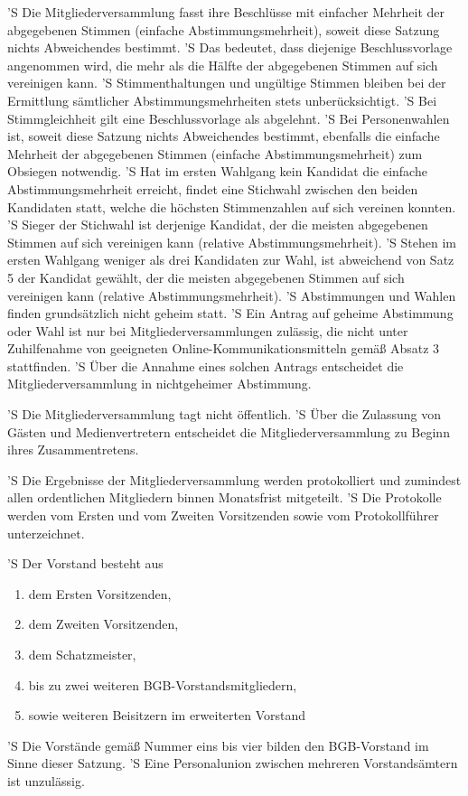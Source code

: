 \documentclass[a4paper,10pt]{scrreprt}
\begin{document}
\begin{contract}
'S Die Mitgliederversammlung fasst ihre Beschlüsse mit einfacher Mehrheit der
abgegebenen Stimmen (einfache Abstimmungsmehrheit), soweit diese Satzung nichts
Abweichendes bestimmt.
'S Das bedeutet, dass diejenige Beschlussvorlage angenommen wird, die mehr als
die Hälfte der abgegebenen Stimmen auf sich vereinigen kann.
'S Stimmenthaltungen und ungültige Stimmen bleiben bei der Ermittlung
sämtlicher Abstimmungsmehrheiten stets unberücksichtigt.
'S Bei Stimmgleichheit gilt eine Beschlussvorlage als abgelehnt.
'S Bei Personenwahlen ist, soweit diese Satzung nichts Abweichendes bestimmt,
ebenfalls die einfache Mehrheit der abgegebenen Stimmen (einfache
Abstimmungsmehrheit) zum Obsiegen notwendig.
'S Hat im ersten Wahlgang kein Kandidat die einfache Abstimmungsmehrheit
erreicht, findet eine Stichwahl zwischen den beiden Kandidaten statt, welche
die höchsten Stimmenzahlen auf sich vereinen konnten.
'S Sieger der Stichwahl ist derjenige Kandidat, der die meisten abgegebenen
Stimmen auf sich vereinigen kann (relative Abstimmungsmehrheit).
'S Stehen im ersten Wahlgang weniger als drei Kandidaten zur Wahl, ist
abweichend von Satz 5 der Kandidat gewählt, der die meisten abgegebenen Stimmen
auf sich vereinigen kann (relative Abstimmungsmehrheit).
'S Abstimmungen und Wahlen finden grundsätzlich nicht geheim statt.
'S Ein Antrag auf geheime Abstimmung oder Wahl ist nur bei
Mitgliederversammlungen zulässig, die nicht unter Zuhilfenahme von geeigneten
Online-Kommunikationsmitteln gemäß Absatz 3 stattfinden.
'S Über die Annahme eines solchen Antrags entscheidet die Mitgliederversammlung
in nichtgeheimer Abstimmung.

'S Die Mitgliederversammlung tagt nicht öffentlich.
'S Über die Zulassung von Gästen und Medienvertretern entscheidet die
Mitgliederversammlung zu Beginn ihres Zusammentretens.

'S Die Ergebnisse der Mitgliederversammlung werden protokolliert und zumindest
allen ordentlichen Mitgliedern binnen Monatsfrist mitgeteilt.
'S Die Protokolle werden vom Ersten und vom Zweiten Vorsitzenden sowie vom
Protokollführer unterzeichnet.


'S Der Vorstand besteht aus
\begin{enumerate}
	\item dem Ersten Vorsitzenden,
	\item dem Zweiten Vorsitzenden,
	\item dem Schatzmeister,
	\item bis zu zwei weiteren BGB-Vorstandsmitgliedern,
	\item sowie weiteren Beisitzern im erweiterten Vorstand
\end{enumerate}
'S Die Vorstände gemäß Nummer eins bis vier bilden den BGB-Vorstand im Sinne dieser Satzung.
'S Eine Personalunion zwischen mehreren Vorstandsämtern ist unzulässig.
\label{vorstand}


\end{contract}
\end{document}
